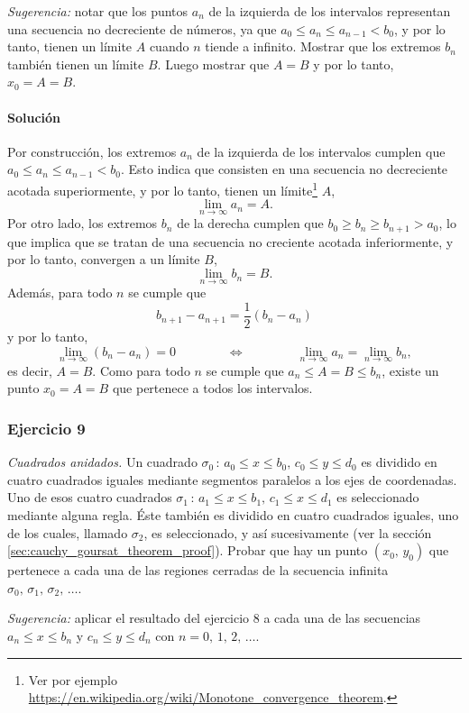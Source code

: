 \documentclass[a4paper]{report}
\begin{document}
\emph{Sugerencia:} notar que los puntos \(a_n\) de la izquierda de los intervalos representan una secuencia no decreciente de números, ya que \(a_0\leq a_n\leq a_{n-1}<b_0\), y por lo tanto, tienen un límite \(A\) cuando \(n\) tiende a infinito. Mostrar que los extremos \(b_n\) también tienen un límite \(B\). Luego mostrar que \(A=B\) y por lo tanto, \(x_0=A=B\).

\paragraph{Solución} Por construcción, los extremos \(a_n\) de la izquierda de los intervalos cumplen que \(a_0\leq a_n\leq a_{n-1}<b_0\). Esto indica que consisten en una secuencia no decreciente acotada superiormente, y por lo tanto, tienen un límite\footnote{Ver por ejemplo \url{https://en.wikipedia.org/wiki/Monotone_convergence_theorem}.} \(A\),
\[
 \lim_{n\to\infty}a_n=A.
\]
Por otro lado, los extremos \(b_n\) de la derecha cumplen que \(b_0\geq b_{n}\geq b_{n+1}>a_0\), lo que implica que se tratan de una secuencia no creciente acotada inferiormente, y por lo tanto, convergen a un límite \(B\),
\[
 \lim_{n\to\infty}b_n=B.
\]
Además, para todo \(n\) se cumple que 
\[
 b_{n+1}-a_{n+1}=\frac{1}{2}(b_n-a_n)
\]
y por lo tanto,
\[
 \lim_{n\to\infty}(b_n-a_n)=0
 \qquad\qquad\Leftrightarrow\qquad\qquad
 \lim_{n\to\infty}a_n=\lim_{n\to\infty}b_n,
\]
es decir, \(A=B\). Como para todo \(n\) se cumple que \(a_n\leq A=B\leq b_n\), existe un punto \(x_0=A=B\) que pertenece a todos los intervalos.

\subsubsection*{Ejercicio 9}

\emph{Cuadrados anidados.} Un cuadrado \(\sigma_0\,:\,a_0\leq x\leq b_0,\,c_0\leq y\leq d_0\) es dividido en cuatro cuadrados iguales mediante segmentos paralelos a los ejes de coordenadas. Uno de esos cuatro cuadrados \(\sigma_1\,:\,a_1\leq x\leq b_1,\,c_1\leq x\leq d_1\) es seleccionado mediante alguna regla. Éste también es dividido en cuatro cuadrados iguales, uno de los cuales, llamado \(\sigma_2\), es seleccionado, y así sucesivamente (ver la sección \ref{sec:cauchy_goursat_theorem_proof}). Probar que hay un punto \((x_0,\,y_0)\) que pertenece a cada una de las regiones cerradas de la secuencia infinita \(\sigma_0,\,\sigma_1,\,\sigma_2,\,\dots\).

\emph{Sugerencia:} aplicar el resultado del ejercicio 8 a cada una de las secuencias \(a_n\leq x\leq b_n\) y \(c_n\leq y\leq d_n\) con \(n=0,\,1,\,2,\,\dots\).
\end{document}
